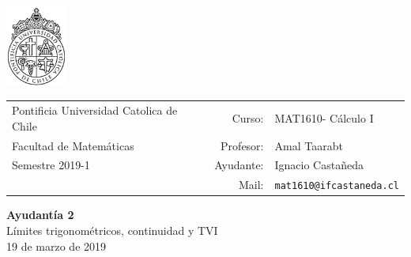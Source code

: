 \documentclass[12pt]{article}
\makeatletter
\newcommand{\ayudantia}{{\sc Ayudantía 2}}
\newcommand{\tituloayu}{Límites trigonométricos, continuidad y TVI}
\newcommand{\fecha}{19 de marzo de 2019}
\newcommand{\sigla}{MAT1610}
\newcommand{\nombre}{Cálculo I}
\newcommand{\profesor}{Amal Taarabt}
\newcommand{\ano}{2019}
\newcommand{\semestre}{1}
\newcommand{\mail}{mat1610@ifcastaneda.cl}
\makeatother
\begin{document}
\thispagestyle{empty}

\begin{minipage}{2cm}
	\includegraphics[width=2cm]{../../../../img/logo.pdf}
	\vspace{0.5cm}
\end{minipage}
\begin{minipage}{\linewidth}
	\begin{tabular}{lrl}
		{\scriptsize\sc Pontificia Universidad Catolica de Chile} & \hspace*{0.7in}Curso: &
		\sigla  - \nombre\\
		{\sc Facultad de Matemáticas}&
		Profesor: & \profesor \\
		{\sc Semestre \ano-\semestre} & Ayudante: & {Ignacio Castañeda}\\
		& {Mail:} & \texttt{\mail}
	\end{tabular}
\end{minipage}

\vspace{-10mm}
\begin{center}
	{\LARGE\bf \ayudantia}\\
	\vspace{0.1cm}
	{\tituloayu}\\
	\vspace{0.1cm}
	\fecha\\
	\vspace{0.4cm}
\end{center}
\end{document}
